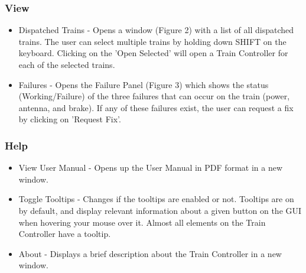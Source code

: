 \documentclass[letterpaper]{article}
\begin{document}
\subsubsection{View}
	\begin{itemize}
		\item Dispatched Trains - Opens a window (Figure 2) with a list of all dispatched trains. The user can select multiple trains by holding down SHIFT on the keyboard. Clicking on the 'Open Selected' will open a Train Controller for each of the selected trains.  
		\item Failures - Opens the Failure Panel (Figure 3) which shows the status (Working/Failure) of the three failures that can occur on the train (power, antenna, and brake). If any of these failures exist, the user can request a fix by clicking on 'Request Fix'. 
	\end{itemize}
	 
\subsubsection{Help}
	\begin{itemize}
		\item View User Manual - Opens up the User Manual in PDF format in a new window. 
		\item Toggle Tooltips - Changes if the tooltips are enabled or not. Tooltips are on by default, and display relevant information about a given button on the GUI when hovering your mouse over it. Almost all elements on the Train Controller have a tooltip. 
		\item About - Displays a brief description about the Train Controller in a new window.
	\end{itemize}
\end{document}
